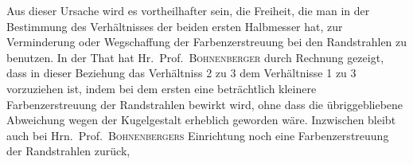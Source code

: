 Aus dieser Ursache wird es vortheilhafter sein, die Freiheit, die man in der Bestimmung des Verhältnisses der beiden ersten Halbmesser hat, zur Verminderung oder Wegschaffung der Farbenzerstreuung bei den Randstrahlen zu benutzen. In der That hat Hr.\ Prof.\ \textsc{Bohnenberger} durch Rechnung gezeigt, dass in dieser Beziehung das Verhältniss 2 zu 3 dem Verhältnisse 1 zu 3 vorzuziehen ist, indem bei dem ersten eine beträchtlich kleinere Farbenzerstreuung der Randstrahlen bewirkt wird, ohne dass die übriggebliebene Abweichung wegen der Kugelgestalt erheblich geworden wäre. Inzwischen bleibt auch bei Hrn.\ Prof.\ \textsc{Bohnenbergers} Einrichtung noch eine Farbenzerstreuung der Randstrahlen zurück,
\par{}
